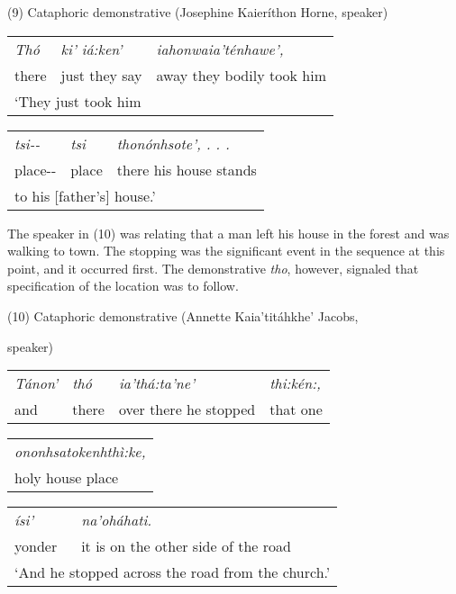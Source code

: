 \documentclass[output=paper,colorlinks,citecolor=brown
]{langscibook}
\begin{document}
(9) Cataphoric demonstrative (Josephine Kaieríthon Horne, speaker)\\

\begin{tabular}{lll}
\emph{Thó} & \emph{ki' iá:ken'} &\emph{iahonwaia'ténhawe',}\\

there & just they say & away they bodily took him\\
\multicolumn{3}{l}{`They just took him}
\end{tabular}\bigskip

\begin{tabular}{lll}
\emph{tsi-\/-} & \emph{tsi} & \emph{thonónhsote', . . .}\\

place-\/- & place & there his house stands\\
\multicolumn{3}{l}{to his {[}father's{]} house.'}
\end{tabular}\bigskip

The speaker in (10) was relating that a man left his house in the forest and was walking to town. The stopping was the significant event in the sequence at this point, and it occurred first. The demonstrative \emph{tho}, however, signaled that specification of the location was to follow.\bigskip


(10) Cataphoric demonstrative (Annette Kaia'titáhkhe' Jacobs,

speaker)\\

\begin{tabular}{llll}
\emph{Tánon'} & \emph{thó} & \emph{ia'thá:ta'ne'} &\emph{ thi:kén:,}\\

and & there & over there he stopped & that one
\end{tabular}\bigskip

\begin{tabular}{l}
\emph{ononhsatokenhthì:ke,}\\

holy house place
\end{tabular}\bigskip

\begin{tabular}{ll}
\emph{ísi'} & \emph{na'oháhati.}\\

yonder & it is on the other side of the road\\
\multicolumn{2}{l}{`And he stopped across the road from the church.'}
\end{tabular}\bigskip
\end{document}
